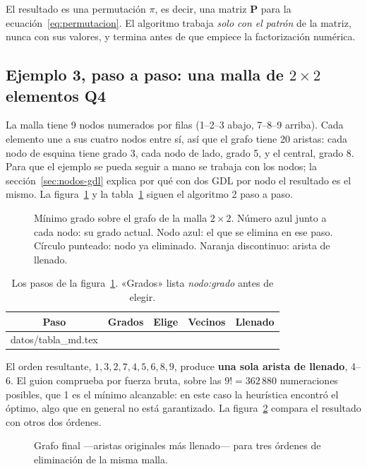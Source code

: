 \documentclass[11pt,a4paper]{article}
\makeatletter
\newcommand{\filas}[1]{\@@input #1 }
\makeatother
\begin{document}
El resultado es una permutación $\pi$, es decir, una matriz $\bm{P}$ para la ecuación~\eqref{eq:permutacion}. El algoritmo trabaja \emph{solo con el patrón} de la matriz, nunca con sus valores, y termina antes de que empiece la factorización numérica.

\subsection{Ejemplo 3, paso a paso: una malla de \texorpdfstring{$2\times2$}{2x2} elementos Q4}\label{sec:ejemplo3}

La malla tiene 9 nodos numerados por filas (1--2--3 abajo, 7--8--9 arriba). Cada elemento une a sus cuatro nodos entre sí, así que el grafo tiene 20 aristas: cada nodo de esquina tiene grado 3, cada nodo de lado, grado 5, y el central, grado 8. Para que el ejemplo se pueda seguir a mano se trabaja con los nodos; la sección~\ref{sec:nodos-gdl} explica por qué con dos GDL por nodo el resultado es el mismo. La figura~\ref{fig:md-pasos} y la tabla~\ref{tab:md} siguen el algoritmo 2 paso a paso.

\begin{figure}[htbp]
\centering

\caption{Mínimo grado sobre el grafo de la malla $2\times2$. Número azul junto a cada nodo: su grado actual. Nodo azul: el que se elimina en ese paso. Círculo punteado: nodo ya eliminado. Naranja discontinuo: arista de llenado.}
\label{fig:md-pasos}
\end{figure}

\begin{table}[htbp]
\centering
\caption{Los pasos de la figura~\ref{fig:md-pasos}. «Grados» lista \emph{nodo:grado} antes de elegir.}
\label{tab:md}
\footnotesize
\begin{tabular}{c p{6.4cm} c c c}
\toprule
Paso & Grados & Elige & Vecinos & Llenado \\
\midrule
\filas{datos/tabla_md.tex}
\bottomrule
\end{tabular}
\end{table}

El orden resultante, $1,3,2,7,4,5,6,8,9$, produce \textbf{una sola arista de llenado}, 4--6. El guion comprueba por fuerza bruta, sobre las $9!=362\,880$ numeraciones posibles, que 1 es el mínimo alcanzable: en este caso la heurística encontró el óptimo, algo que en general no está garantizado. La figura~\ref{fig:md-comparacion} compara el resultado con otros dos órdenes.

\begin{figure}[htbp]
\centering

\caption{Grafo final ---aristas originales más llenado--- para tres órdenes de eliminación de la misma malla.}
\label{fig:md-comparacion}
\end{figure}
\end{document}
